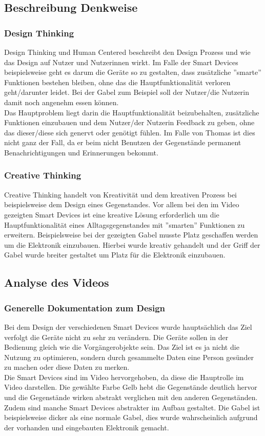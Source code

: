 
\subsection{Beschreibung Denkweise}
\subsubsection{\textbf{Design Thinking}}
Design Thinking und Human Centered\cite{slidesDesign} beschreibt den Design Prozess und wie das Design auf Nutzer und Nutzerinnen wirkt. Im Falle der Smart Devices beispielsweise geht es darum die Geräte so zu gestalten, dass zusätzliche ''smarte'' Funktionen bestehen bleiben, ohne das die Hauptfunktionalität verloren geht/darunter leidet. Bei der Gabel zum Beispiel soll der Nutzer/die Nutzerin damit noch angenehm essen können. \\
Das Hauptproblem liegt darin die Hauptfunktionalität beizubehalten, zusätzliche Funktionen einzubauen und dem Nutzer/der Nutzerin Feedback zu geben, ohne das dieser/diese sich genervt oder genötigt fühlen. Im Falle von Thomas\cite{uninvatedGuests} ist dies nicht ganz der Fall, da er beim nicht Benutzen der Gegenstände permanent Benachrichtigungen und Erinnerungen bekommt.
\subsubsection{\textbf{Creative Thinking}}
Creative Thinking\cite{slidesCreative} handelt von Kreativität und dem kreativen Prozess bei beispielsweise dem Design eines Gegenstandes. Vor allem bei den im Video\cite{uninvatedGuests} gezeigten Smart Devices ist eine kreative Lösung erforderlich um die Hauptfunktionalität eines Alltagsgegenstandes mit ''smarten'' Funktionen zu erweitern. Beispielsweise bei der gezeigten Gabel\cite{uninvatedGuests} musste Platz geschaffen werden um die Elektronik einzubauen. Hierbei wurde kreativ gehandelt und der Griff der Gabel wurde breiter gestaltet um Platz für die Elektronik einzubauen.
\subsection{Analyse des Videos}
\subsubsection{\textbf{Generelle Dokumentation zum Design}} 
Bei dem Design der verschiedenen Smart Devices wurde hauptsächlich das Ziel verfolgt die Geräte nicht zu sehr zu verändern. Die Geräte sollen in der Bedienung gleich wie die Vorgängerobjekte sein. Das Ziel ist es ja nicht die Nutzung zu optimieren, sondern durch gesammelte Daten eine Person gesünder zu machen oder diese Daten zu merken. \\
Die Smart Devices sind im Video hervorgehoben, da diese die Hauptrolle im Video darstellen. Die gewählte Farbe Gelb hebt die Gegenstände deutlich hervor und die Gegenstände wirken abstrakt verglichen mit den anderen Gegenständen. Zudem sind manche Smart Devices abstrakter im Aufbau gestaltet. Die Gabel ist beispielsweise dicker als eine normale Gabel, dies wurde wahrscheinlich aufgrund der vorhanden und eingebauten Elektronik gemacht. \\
